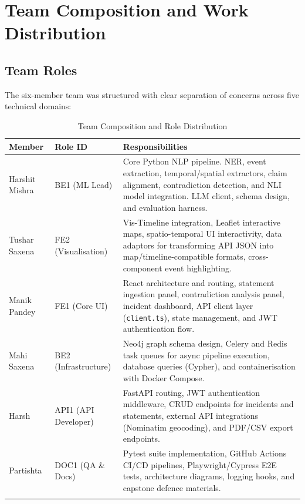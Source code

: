 \documentclass[12pt,a4paper]{report}
\begin{document}
\chapter{Team Composition and Work Distribution}

\section{Team Roles}

The six-member team was structured with clear separation of concerns across five technical domains:

\begin{longtable}{p{3.5cm} p{2.5cm} p{8cm}}
\toprule
\textbf{Member} & \textbf{Role ID} & \textbf{Responsibilities} \\
\midrule
\endhead
Harshit Mishra & BE1 (ML Lead) & Core Python NLP pipeline. NER, event extraction, temporal/spatial extractors, claim alignment, contradiction detection, and NLI model integration. LLM client, schema design, and evaluation harness. \\[0.3cm]
Tushar Saxena & FE2 (Visualisation) & Vis-Timeline integration, Leaflet interactive maps, spatio-temporal UI interactivity, data adaptors for transforming API JSON into map/timeline-compatible formats, cross-component event highlighting. \\[0.3cm]
Manik Pandey & FE1 (Core UI) & React architecture and routing, statement ingestion panel, contradiction analysis panel, incident dashboard, API client layer (\texttt{client.ts}), state management, and JWT authentication flow. \\[0.3cm]
Mahi Saxena & BE2 (Infrastructure) & Neo4j graph schema design, Celery and Redis task queues for async pipeline execution, database queries (Cypher), and containerisation with Docker Compose. \\[0.3cm]
Harsh & API1 (API Developer) & FastAPI routing, JWT authentication middleware, CRUD endpoints for incidents and statements, external API integrations (Nominatim geocoding), and PDF/CSV export endpoints. \\[0.3cm]
Partishta & DOC1 (QA \& Docs) & Pytest suite implementation, GitHub Actions CI/CD pipelines, Playwright/Cypress E2E tests, architecture diagrams, logging hooks, and capstone defence materials. \\
\bottomrule
\caption{Team Composition and Role Distribution}
\label{tab:team}
\end{longtable}
\end{document}
